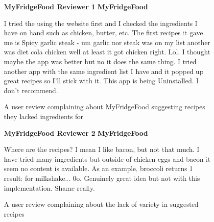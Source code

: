 \newcommand{\review}[6]{
    \begin{figure}[H]
        \caption{#1}
        \label{#2}

        \textbf{#3} #4
        \hfill\textbf{#5}

        #6
    \end{figure}
}

\review
    {A user review complaining about MyFridgeFood suggesting recipes they lacked ingredients for}
    {fig:review_missing_ingredients}
    {MyFridgeFood Reviewer 1}
    {\dingstarfull \dingstarempty \dingstarempty \dingstarempty \dingstarempty}
    {MyFridgeFood}
    {
        I tried the using the website first and I checked the ingredients I have on hand such as chicken,
        butter, etc. The first recipes it gave me is Spicy garlic steak - um garlic nor steak was on my list another was
        diet cola chicken well at least it got chicken right. Lol. I thought maybe the app was better but no it does the same thing.
        I tried another app with the same ingredient list I have and it popped up great recipes so I'll stick with it.
        This app is being Uninstalled. I don't recommend.
    }

\review
    {A user review complaining about the lack of variety in suggested recipes}
    {fig:review_lack_variety}
    {MyFridgeFood Reviewer 2}
    {\dingstarfull \dingstarfull \dingstarempty \dingstarempty \dingstarempty}
    {MyFridgeFood}
    {
        Where are the recipes? I mean I like bacon, but not that much. I have tried many ingredients
        but outside of chicken eggs and bacon it seem no content is available. As an example,
        broccoli returns 1 result: for milkshake... 0\textunderscore o. Genuinely great idea but not with this
        implementation. Shame really.
    }

